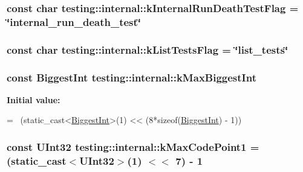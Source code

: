 \hypertarget{namespacetesting_1_1internal_abdcf0e0c1b0ec4fbb1e004c3805997d0}{
\subsubsection[{k\-Internal\-Run\-Death\-Test\-Flag}]{\setlength{\rightskip}{0pt plus 5cm}const char testing\-::internal\-::k\-Internal\-Run\-Death\-Test\-Flag = \char`\"{}internal\-\_\-run\-\_\-death\-\_\-test\char`\"{}}}\label{namespacetesting_1_1internal_abdcf0e0c1b0ec4fbb1e004c3805997d0}
\hypertarget{namespacetesting_1_1internal_a1042c47d58fd11f22540c9b4e463b20a}{
\subsubsection[{k\-List\-Tests\-Flag}]{\setlength{\rightskip}{0pt plus 5cm}const char testing\-::internal\-::k\-List\-Tests\-Flag = \char`\"{}list\-\_\-tests\char`\"{}}}\label{namespacetesting_1_1internal_a1042c47d58fd11f22540c9b4e463b20a}
\hypertarget{namespacetesting_1_1internal_ad901880198832bc166d2493096b451f7}{
\subsubsection[{k\-Max\-Biggest\-Int}]{\setlength{\rightskip}{0pt plus 5cm}const {\bf Biggest\-Int} testing\-::internal\-::k\-Max\-Biggest\-Int}}\label{namespacetesting_1_1internal_ad901880198832bc166d2493096b451f7}
{\bfseries Initial value\-:}
\begin{DoxyCode}
=
    ~(\textcolor{keyword}{static\_cast<}\hyperlink{namespacetesting_1_1internal_a05c6bd9ede5ccdf25191a590d610dcc6}{BiggestInt}\textcolor{keyword}{>}(1) << (8*\textcolor{keyword}{sizeof}(\hyperlink{namespacetesting_1_1internal_a05c6bd9ede5ccdf25191a590d610dcc6}{BiggestInt}) - 1))
\end{DoxyCode}
\hypertarget{namespacetesting_1_1internal_a128515c8ed6c0fe98e498c8042da2060}{
\subsubsection[{k\-Max\-Code\-Point1}]{\setlength{\rightskip}{0pt plus 5cm}const {\bf U\-Int32} testing\-::internal\-::k\-Max\-Code\-Point1 = (static\-\_\-cast$<${\bf U\-Int32}$>$(1) $<$$<$ 7) -\/ 1}}\label{namespacetesting_1_1internal_a128515c8ed6c0fe98e498c8042da2060}
